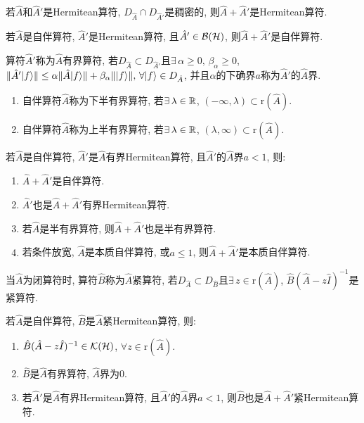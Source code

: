 \begin{theorem}
    若$\hat{A}$和$\hat{A}'$是Hermitean算符, $D_{\hat{A}}\cap D_{\hat{A}'}$是稠密的, 则$\hat{A}+\hat{A}'$是Hermitean算符.
\end{theorem}
\begin{theorem}
    若$\hat{A}$是自伴算符, $\hat{A}'$是Hermitean算符, 且$\hat{A}'\in\mathcal{B}(\mathcal{H})$, 则$\hat{A}+\hat{A}'$是自伴算符.
\end{theorem}
\begin{definition}
    算符$\hat{A}'$称为$\hat{A}$有界算符, 若$D_{\hat{A}}\subset D_{\hat{A}'}$且$\exists\,\alpha\ge0,\,\beta_\alpha\ge0$, $\lVert\hat{A}'|f\rangle\rVert\le\alpha\lVert\hat{A}|f\rangle\rVert+\beta_\alpha\lVert|f\rangle\rVert,\,\forall|f\rangle\in D_{\hat{A}}$, 并且$\alpha$的下确界$a$称为$\hat{A}'$的$\hat{A}$界.
\end{definition}
\begin{definition}
    \begin{enumerate}
        \item 自伴算符$\hat{A}$称为下半有界算符, 若$\exists\,\lambda\in\mathbb{R}$, $(-\infty,\lambda)\subset\text{r}(\hat{A})$.
        \item 自伴算符$\hat{A}$称为上半有界算符, 若$\exists\,\lambda\in\mathbb{R}$, $(\lambda,\infty)\subset\text{r}(\hat{A})$.
    \end{enumerate}
\end{definition}
\begin{theorem}
    若$\hat{A}$是自伴算符, $\hat{A}'$是$\hat{A}$有界Hermitean算符, 且$\hat{A}'$的$\hat{A}$界$a<1$, 则:
    \begin{enumerate}
        \item $\hat{A}+\hat{A}'$是自伴算符.
        \item $\hat{A}'$也是$\hat{A}+\hat{A}'$有界Hermitean算符.
        \item 若$\hat{A}$是半有界算符, 则$\hat{A}+\hat{A}'$也是半有界算符.
        \item 若条件放宽, $\hat{A}$是本质自伴算符, 或$a\le1$, 则$\hat{A}+\hat{A}'$是本质自伴算符.
    \end{enumerate}
\end{theorem}
\begin{definition}
    当$\hat{A}$为闭算符时, 算符$\hat{B}$称为$\hat{A}$紧算符, 若$D_{\hat{A}}\subset D_{\hat{B}}$且$\exists\,z\in\text{r}(\hat{A})$, $\hat{B}(\hat{A}-z\hat{I})^{-1}$是紧算符.
\end{definition}
\begin{theorem}
    若$\hat{A}$是自伴算符, $\hat{B}$是$\hat{A}$紧Hermitean算符, 则:
    \begin{enumerate}
        \item $\hat{B}(\hat{A}-z\hat{I})^{-1}\in\mathcal{K}(\mathcal{H})$, $\forall z\in\text{r}(\hat{A})$.
        \item $\hat{B}$是$\hat{A}$有界算符, $\hat{A}$界为$0$.
        \item 若$\hat{A}'$是$\hat{A}$有界Hermitean算符, 且$\hat{A}'$的$\hat{A}$界$a<1$, 则$\hat{B}$也是$\hat{A}+\hat{A}'$紧Hermitean算符.
    \end{enumerate}
\end{theorem}
